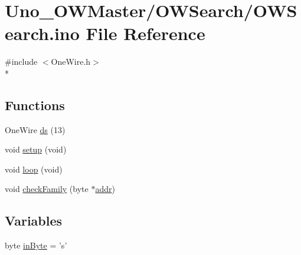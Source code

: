 \hypertarget{OWSearch_8ino}{\section{Uno\-\_\-\-O\-W\-Master/\-O\-W\-Search/\-O\-W\-Search.ino File Reference}
\label{OWSearch_8ino}
}
{\ttfamily \#include $<$One\-Wire.\-h$>$}\\*
\subsection*{Functions}
\begin{DoxyCompactItemize}
\item 
One\-Wire \hyperlink{OWSearch_8ino_a7ac2589d8de3c5bc02dcfe7fc62068e7}{ds} (13)
\item 
void \hyperlink{OWSearch_8ino_a7dfd9b79bc5a37d7df40207afbc5431f}{setup} (void)
\item 
void \hyperlink{OWSearch_8ino_a0b33edabd7f1c4e4a0bf32c67269be2f}{loop} (void)
\item 
void \hyperlink{OWSearch_8ino_a9a919d3a96bcb356e716cc5e9d8197a2}{check\-Family} (byte $\ast$\hyperlink{OWP__DG__1w-adaptor_8ino_a0fc5da2e63a94559429ec9aec32f1831}{addr})
\end{DoxyCompactItemize}
\subsection*{Variables}
\begin{DoxyCompactItemize}
\item 
byte \hyperlink{OWSearch_8ino_a62cd173143ff9c15a38fd17ab56970c9}{in\-Byte} = 's'
\end{DoxyCompactItemize}



